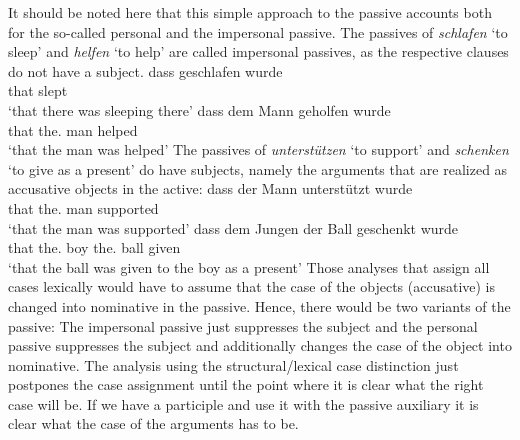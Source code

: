 \largerpage
It should be noted here that this simple approach to the passive accounts both for the so-called
personal and the impersonal passive. The passives of \emph{schlafen} `to sleep' and \emph{helfen}
`to help' are called impersonal passives, as the respective clauses do not have a subject. 
\eal
\ex 
\gll dass geschlafen wurde\\
     that slept      \AUX\\\german
\glt `that there was sleeping there'
\ex
\gll dass dem Mann geholfen wurde\\
     that the.\DAT{} man helped \AUX\\
\glt `that the man was helped'
\zl
The passives of \emph{unterstützen} `to support' and \emph{schenken} `to give as a present' do have
subjects, namely the arguments that are realized as accusative objects in the active:
\eal
\ex 
\gll dass der Mann unterstützt wurde\\
     that the.\NOM{} man supported \AUX\\\german
\glt `that the man was supported'
\ex
\gll dass dem Jungen der Ball geschenkt wurde\\
     that the.\DAT{} boy the.\NOM{} ball given \AUX\\
\glt `that the ball was given to the boy as a present'
\zl
Those analyses that assign all cases lexically would have to assume that the case of the objects
(accusative) is changed into nominative in the passive. Hence, there would be two variants of the
passive: The impersonal passive just suppresses the subject and the personal passive suppresses the
subject and additionally changes the case of the object into nominative. The analysis using the
structural/lexical case distinction just postpones the case assignment until the point where it is
clear what the right case will be. If we have a participle and use it with the passive auxiliary it
is clear what the case of the arguments has to be.





